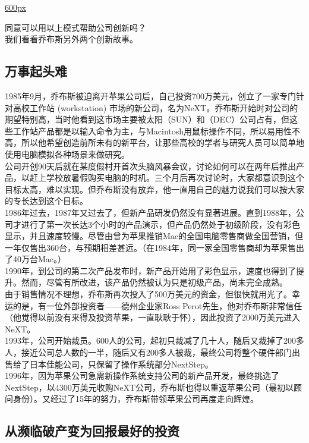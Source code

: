 \href{文件:385页替换图片.png}{600px}

同意可以用以上模式帮助公司创新吗？\\
我们看看乔布斯另外两个创新故事。

\hypertarget{ux4e07ux4e8bux8d77ux5934ux96be}{%
\subsection{万事起头难}\label{ux4e07ux4e8bux8d77ux5934ux96be}}

1985年9月，乔布斯被迫离开苹果公司后，自己投资700万美元，创立了一家专门针对高校工作站
(workstation)
市场的新公司，名为NeXT。乔布斯开始时对公司的期望特别高，当时他看到这市场主要被太阳（SUN）和（DEC）公司占有，但这些工作站产品都是以输入命令为主，与Macintosh用鼠标操作不同，所以易用性不高，所以他希望创造前所未有的新平台，让那些高校的学者与研究人员可以简单地使用电脑模拟各种场景来做研究。\\
公司开创90天后就在某度假村开首次头脑风暴会议，讨论如何可以在两年后推出产品，以赶上学校放暑假购买电脑的时机。三个月后再次讨论时，大家都意识到这个目标太高，难以实现。但乔布斯没有放弃，他一直用自己的魅力说我们可以按大家的专长达到这个目标。\\
1986年过去，1987年又过去了，但新产品研发仍然没有显著进展。直到1988年，公司才进行了第一次长达3个小时的产品演示，但产品仍然处于初级阶段，没有彩色显示，并且速度较慢。尽管由曾为苹果推销Mac的全国电脑零售商做全国营销，但一年仅售出360台，与预期相差甚远。（在1984年，同一家全国零售商却为苹果售出了40万台Mac。）\\
1990年，到公司的第二次产品发布时，新产品开始用了彩色显示，速度也得到了提升。然而，尽管有所改进，该产品仍然被认为只是初级产品，尚未完全成熟。\\
由于销售情况不理想，乔布斯再次投入了500万美元的资金，但很快就用光了。幸运的是，有一位外部投资者------德州企业家Ross
Perot先生，他对乔布斯非常信任（他觉得以前没有来得及投资苹果，一直耿耿于怀），因此投资了2000万美元进入NeXT。\\
1993年，公司开始裁员。600人的公司，起初只裁减了几十人，随后又裁掉了200多人，接近公司总人数的一半，随后又有200多人被裁，最终公司将整个硬件部门出售给了日本佳能公司，只保留了操作系统部分NextStep。\\
1996年，因为苹果公司急需新操作系统支持公司的新产品开发，最终挑选了NextStep，以4300万美元收购NeXT公司，乔布斯也得以重返苹果公司（最初以顾问身份）。又经过了15年的努力，乔布斯带领苹果公司再度走向辉煌。

\hypertarget{ux4eceux6fd2ux4e34ux7834ux4ea7ux53d8ux4e3aux56deux62a5ux6700ux597dux7684ux6295ux8d44}{%
\subsection{从濒临破产变为回报最好的投资}\label{ux4eceux6fd2ux4e34ux7834ux4ea7ux53d8ux4e3aux56deux62a5ux6700ux597dux7684ux6295ux8d44}}

